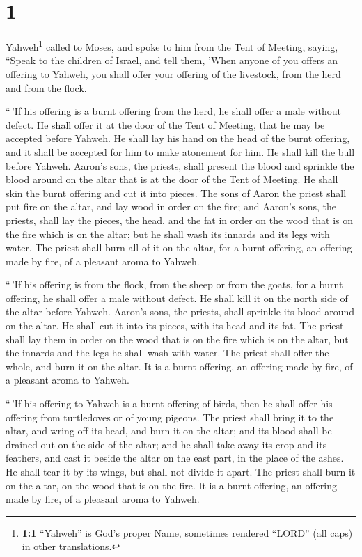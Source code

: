 \hypertarget{section}{%
\section{1}\label{section}}

 Yahweh\footnote{\textbf{1:1} ``Yahweh'' is God's proper
  Name, sometimes rendered ``LORD'' (all caps) in other translations.}
called to Moses, and spoke to him from the Tent of Meeting, saying,
 ``Speak to the children of Israel, and tell them, 'When
anyone of you offers an offering to Yahweh, you shall offer your
offering of the livestock, from the herd and from the flock.

 ``\,'If his offering is a burnt offering from the herd,
he shall offer a male without defect. He shall offer it at the door of
the Tent of Meeting, that he may be accepted before Yahweh.
 He shall lay his hand on the head of the burnt offering,
and it shall be accepted for him to make atonement for him.
 He shall kill the bull before Yahweh. Aaron's sons, the
priests, shall present the blood and sprinkle the blood around on the
altar that is at the door of the Tent of Meeting.  He
shall skin the burnt offering and cut it into pieces.  The
sons of Aaron the priest shall put fire on the altar, and lay wood in
order on the fire;  and Aaron's sons, the priests, shall
lay the pieces, the head, and the fat in order on the wood that is on
the fire which is on the altar;  but he shall wash its
innards and its legs with water. The priest shall burn all of it on the
altar, for a burnt offering, an offering made by fire, of a pleasant
aroma to Yahweh.

 ``\,'If his offering is from the flock, from the sheep
or from the goats, for a burnt offering, he shall offer a male without
defect.  He shall kill it on the north side of the altar
before Yahweh. Aaron's sons, the priests, shall sprinkle its blood
around on the altar.  He shall cut it into its pieces,
with its head and its fat. The priest shall lay them in order on the
wood that is on the fire which is on the altar,  but the
innards and the legs he shall wash with water. The priest shall offer
the whole, and burn it on the altar. It is a burnt offering, an offering
made by fire, of a pleasant aroma to Yahweh.

 ``\,'If his offering to Yahweh is a burnt offering of
birds, then he shall offer his offering from turtledoves or of young
pigeons.  The priest shall bring it to the altar, and
wring off its head, and burn it on the altar; and its blood shall be
drained out on the side of the altar;  and he shall take
away its crop and its feathers, and cast it beside the altar on the east
part, in the place of the ashes.  He shall tear it by its
wings, but shall not divide it apart. The priest shall burn it on the
altar, on the wood that is on the fire. It is a burnt offering, an
offering made by fire, of a pleasant aroma to Yahweh.

